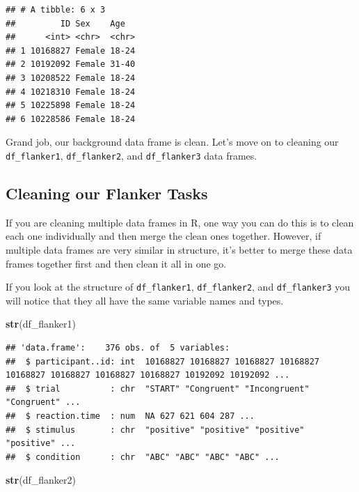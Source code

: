 \documentclass[
]{book}
\newenvironment{Shaded}{\begin{snugshade}}{\end{snugshade}}
\newcommand{\FunctionTok}[1]{\textcolor[rgb]{0.13,0.29,0.53}{\textbf{#1}}}
\newcommand{\NormalTok}[1]{#1}
\begin{document}
\begin{verbatim}
## # A tibble: 6 x 3
##         ID Sex    Age  
##      <int> <chr>  <chr>
## 1 10168827 Female 18-24
## 2 10192092 Female 31-40
## 3 10208522 Female 18-24
## 4 10218310 Female 18-24
## 5 10225898 Female 18-24
## 6 10228586 Female 18-24
\end{verbatim}

Grand job, our background data frame is clean. Let's move on to cleaning our \texttt{df\_flanker1}, \texttt{df\_flanker2}, and \texttt{df\_flanker3} data frames.

\hypertarget{cleaning-our-flanker-tasks}{%
\subsection{Cleaning our Flanker Tasks}\label{cleaning-our-flanker-tasks}}

If you are cleaning multiple data frames in R, one way you can do this is to clean each one individually and then merge the clean ones together. However, if multiple data frames are very similar in structure, it's better to merge these data frames together first and then clean it all in one go.

If you look at the structure of \texttt{df\_flanker1}, \texttt{df\_flanker2}, and \texttt{df\_flanker3} you will notice that they all have the same variable names and types.

\begin{Shaded}
\begin{Highlighting}[]
\FunctionTok{str}\NormalTok{(df\_flanker1)}
\end{Highlighting}
\end{Shaded}

\begin{verbatim}
## 'data.frame':    376 obs. of  5 variables:
##  $ participant..id: int  10168827 10168827 10168827 10168827 10168827 10168827 10168827 10168827 10192092 10192092 ...
##  $ trial          : chr  "START" "Congruent" "Incongruent" "Congruent" ...
##  $ reaction.time  : num  NA 627 621 604 287 ...
##  $ stimulus       : chr  "positive" "positive" "positive" "positive" ...
##  $ condition      : chr  "ABC" "ABC" "ABC" "ABC" ...
\end{verbatim}

\begin{Shaded}
\begin{Highlighting}[]
\FunctionTok{str}\NormalTok{(df\_flanker2)}
\end{Highlighting}
\end{Shaded}
\end{document}
